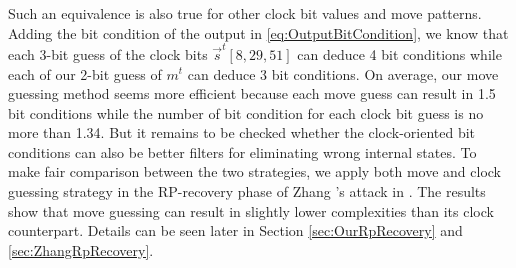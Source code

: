 Such an equivalence is also true for other clock bit values and move patterns.
Adding the bit condition of the output in \eqref{eq:OutputBitCondition}, we know that each 3-bit guess of the clock bits $\vec{s}^t[8,29,51]$ can deduce 4 bit conditions while each of our 2-bit guess of $m^t$ can deduce 3 bit conditions.
On average, our move guessing method seems more efficient because each move guess can result in 1.5 bit conditions while the number of bit condition for each clock bit guess is no more than 1.34.
But it remains to be checked whether the clock-oriented bit conditions can also be better filters for eliminating wrong internal states.
To make fair comparison between the two strategies, we apply both move and clock guessing strategy in the RP-recovery phase of Zhang \etal's attack in \cite{AC:Zhang19}.
The results show that move guessing can result in slightly lower complexities than its clock counterpart.
Details can be seen later in Section \ref{sec:OurRpRecovery} and \ref{sec:ZhangRpRecovery}.

